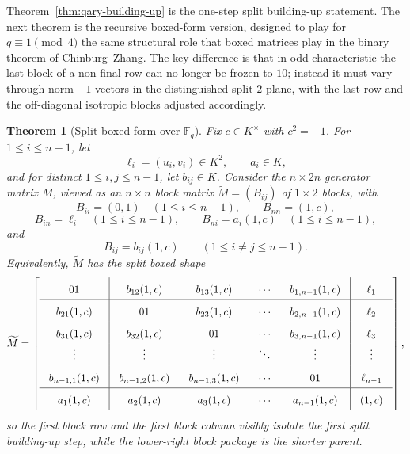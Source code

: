 \documentclass[12pt]{article}
\newtheorem{theorem}{Theorem}[section]
\newcommand{\F}{\mathbb{F}}
\begin{document}
Theorem~\ref{thm:qary-building-up} is the one-step split building-up statement. The next theorem is the recursive boxed-form version, designed to play for \(q\equiv 1\pmod 4\) the same structural role that boxed matrices play in the binary theorem of Chinburg--Zhang. The key difference is that in odd characteristic the last block of a non-final row can no longer be frozen to \(10\); instead it must vary through norm \(-1\) vectors in the distinguished split \(2\)-plane, with the last row and the off-diagonal isotropic blocks adjusted accordingly.

\begin{theorem}[Split boxed form over \texorpdfstring{$\F_q$}{Fq}]
\label{thm:split-boxed-form}
Fix \(c\in K^\times\) with \(c^2=-1\). For \(1\le i\le n-1\), let
\[
\ell_i=(u_i,v_i)\in K^2,
\qquad
a_i\in K,
\]
and for distinct \(1\le i,j\le n-1\), let \(b_{ij}\in K\). Consider the \(n\times 2n\) generator matrix \(M\), viewed as an \(n\times n\) block matrix \(\widetilde M=(B_{ij})\) of \(1\times 2\) blocks, with
\[
B_{ii}=(0,1)\quad (1\le i\le n-1),\qquad B_{nn}=(1,c),
\]
\[
B_{in}=\ell_i \quad (1\le i\le n-1),\qquad
B_{ni}=a_i(1,c)\quad (1\le i\le n-1),
\]
and
\[
B_{ij}=b_{ij}(1,c)\qquad (1\le i\neq j\le n-1).
\]
Equivalently, \(\widetilde M\) has the split boxed shape
\[
\begingroup
\setlength{\arraycolsep}{9pt}
\renewcommand{\arraystretch}{1.72}
\widetilde M=
\left[
\begin{array}{c|cccc|c}
01 & b_{12}(1,c) & b_{13}(1,c) & \cdots & b_{1,n-1}(1,c) & \ell_1 \\
\hline
b_{21}(1,c) & 01 & b_{23}(1,c) & \cdots & b_{2,n-1}(1,c) & \ell_2 \\
b_{31}(1,c) & b_{32}(1,c) & 01 & \cdots & b_{3,n-1}(1,c) & \ell_3 \\
\vdots & \vdots & \vdots & \ddots & \vdots & \vdots \\
b_{n-1,1}(1,c) & b_{n-1,2}(1,c) & b_{n-1,3}(1,c) & \cdots & 01 & \ell_{n-1} \\
\hline
a_1(1,c) & a_2(1,c) & a_3(1,c) & \cdots & a_{n-1}(1,c) & (1,c)
\end{array}
\right],
\endgroup
\]
so the first block row and the first block column visibly isolate the first split building-up step, while the lower-right block package is the shorter parent.


\end{theorem}
\end{document}
